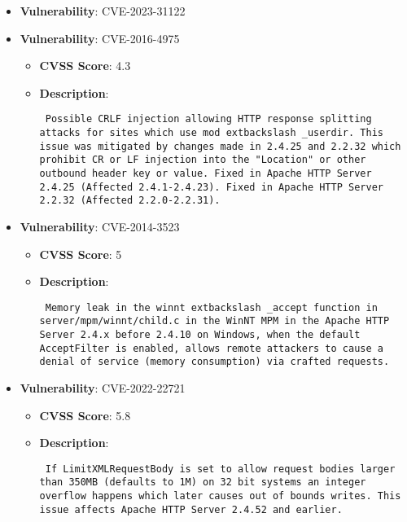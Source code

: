 \documentclass{article}
\begin{document}
\begin{itemize}
        \item \textbf{Vulnerability}: CVE-2023-31122
    
        \item \textbf{Vulnerability}: CVE-2016-4975
        \begin{itemize}
            \item \textbf{CVSS Score}:  4.3 
            \item \textbf{Description}: \parbox{\linewidth}{\texttt{ Possible CRLF injection allowing HTTP response splitting attacks for sites which use mod	extbackslash _userdir. This issue was mitigated by changes made in 2.4.25 and 2.2.32 which prohibit CR or LF injection into the "Location" or other outbound header key or value. Fixed in Apache HTTP Server 2.4.25 (Affected 2.4.1-2.4.23). Fixed in Apache HTTP Server 2.2.32 (Affected 2.2.0-2.2.31). }}
        \end{itemize}
    
        \item \textbf{Vulnerability}: CVE-2014-3523
        \begin{itemize}
            \item \textbf{CVSS Score}:  5 
            \item \textbf{Description}: \parbox{\linewidth}{\texttt{ Memory leak in the winnt	extbackslash _accept function in server/mpm/winnt/child.c in the WinNT MPM in the Apache HTTP Server 2.4.x before 2.4.10 on Windows, when the default AcceptFilter is enabled, allows remote attackers to cause a denial of service (memory consumption) via crafted requests. }}
        \end{itemize}
    
        \item \textbf{Vulnerability}: CVE-2022-22721
        \begin{itemize}
            \item \textbf{CVSS Score}:  5.8 
            \item \textbf{Description}: \parbox{\linewidth}{\texttt{ If LimitXMLRequestBody is set to allow request bodies larger than 350MB (defaults to 1M) on 32 bit systems an integer overflow happens which later causes out of bounds writes. This issue affects Apache HTTP Server 2.4.52 and earlier. }}
        \end{itemize}
    

\end{itemize}
\end{document}
